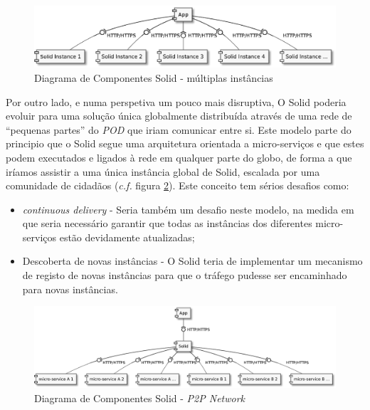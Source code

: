 \begin{figure}[H]
    \begin{center}
    \includegraphics[width=0.8 \textwidth]{figures/solid_web1.eps}
    \caption{Diagrama de Componentes Solid - múltiplas instâncias}
    \label{figure_solid_multiple_instances}
    \end{center}
\end{figure}


Por outro lado, e numa perspetiva um pouco mais disruptiva, O Solid poderia evoluir para uma solução única globalmente distribuída através de uma rede de “pequenas partes” do \emph{\acrshort{POD}} que iriam comunicar entre si. Este modelo parte do principio que o Solid segue uma arquitetura orientada a micro-serviços e que estes podem executados e ligados à rede em qualquer parte do globo, de forma a que iríamos assistir a uma única instância global de Solid, escalada por uma comunidade de cidadãos (\emph{c.f.} figura \ref{figure_solid_p2p_network}).
Este conceito tem sérios desafios como:
\begin{itemize}
    \item \emph{continuous delivery} - Seria também um desafio neste modelo, na medida em que seria necessário garantir que todas as instâncias dos diferentes micro-serviços estão devidamente atualizadas;
    \item Descoberta de novas instâncias - O Solid teria de implementar um mecanismo de registo de novas instâncias para que o tráfego pudesse ser encaminhado para novas instâncias.
\end{itemize}

\begin{figure}[H]
    \begin{center}
    \includegraphics[width=1 \textwidth]{figures/solid_web2.eps}
    \caption{Diagrama de Componentes Solid - \emph{P2P Network}}
    \label{figure_solid_p2p_network}
    \end{center}
\end{figure}

